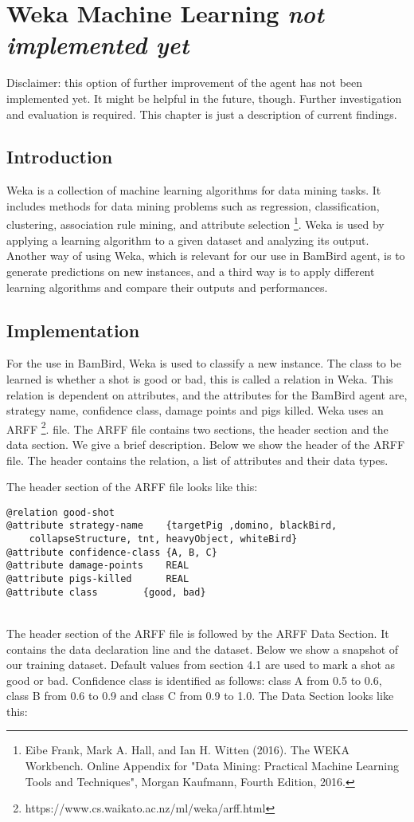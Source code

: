 

\section{Weka Machine Learning \textit{not implemented yet}}
Disclaimer: this option of further improvement of the agent has not been implemented yet. It might be helpful in the future, though. Further investigation and evaluation is required. This chapter is just a description of current findings.

\subsection{Introduction}
Weka is a collection of machine learning algorithms for data mining tasks. It includes methods for data mining problems such as regression, classification, clustering, association rule mining, and attribute selection \footnote{Eibe Frank, Mark A. Hall, and Ian H. Witten (2016). The WEKA Workbench. Online Appendix for "Data Mining: Practical Machine Learning Tools and Techniques", Morgan Kaufmann, Fourth Edition, 2016.}. Weka is used by applying a learning algorithm to a given dataset and analyzing its output. Another way of using Weka, which is relevant for our use in BamBird agent, is to generate predictions on new instances, and a third way is to apply different learning algorithms and compare their outputs and performances.

\subsection{Implementation}
For the use in BamBird, Weka is used to classify a new instance. The class to be learned is whether a shot is good or bad, this is called a relation in Weka. This relation is dependent on attributes, and the attributes for the BamBird agent are, strategy name, confidence class, damage points and pigs killed. Weka uses an ARFF \footnote{https://www.cs.waikato.ac.nz/ml/weka/arff.html}. file. The ARFF file contains two sections, the header section and the data section. We give a brief description. Below we show the header of the ARFF file. The header contains the relation, a list of attributes and their data types.

The header section of the ARFF file looks like this:
\begin{lstlisting}
@relation good-shot
@attribute strategy-name 	{targetPig ,domino, blackBird,
	collapseStructure, tnt, heavyObject, whiteBird}
@attribute confidence-class	{A, B, C}
@attribute damage-points	REAL
@attribute pigs-killed		REAL
@attribute class		{good, bad}
\end{lstlisting}
\ \\
The header section of the ARFF file is followed by the ARFF Data Section. It contains the data declaration line and the dataset. Below we show a snapshot of our training dataset. Default values from section 4.1 are used to mark a shot as good or bad. Confidence class is identified as follows: class A from 0.5 to 0.6, class B from 0.6 to 0.9 and class C from 0.9 to 1.0. The Data Section looks like this:

